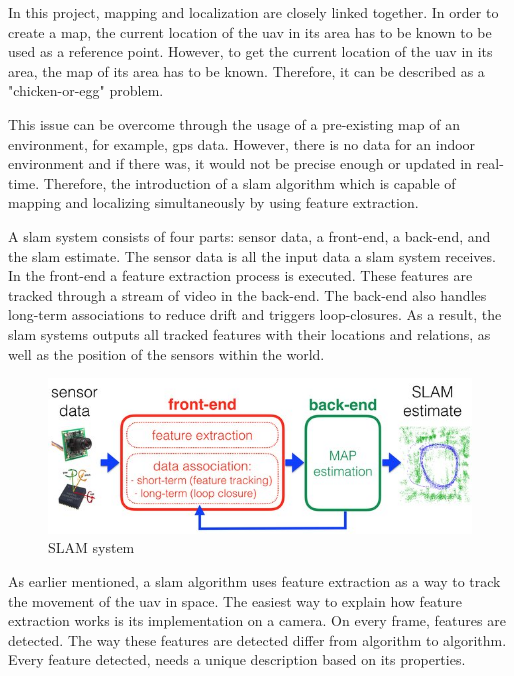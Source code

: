 In this project, mapping and localization are closely linked together. In order to create a map, the current location of the \acs{uav} in its area has to be known to be used as a reference point. However, to get the current location of the \acs{uav} in its area, the map of its area has to be known. Therefore, it can be described as a "chicken\hyp{}or\hyp{}egg" problem.

This issue can be overcome through the usage of a pre-existing map of an environment, for example, \acs{gps} data. However, there is no data for an indoor environment and if there was, it would not be precise enough or updated in real\hyp{}time. Therefore, the introduction of a \acs{slam} algorithm which is capable of mapping and localizing simultaneously by using feature extraction.

A \acs{slam} system consists of four parts: sensor data, a front\hyp{}end, a back\hyp{}end, and the \acs{slam} estimate. The sensor data is all the input data a \acs{slam} system receives. In the front\hyp{}end a feature extraction process is executed. These features are tracked through a stream of video in the back\hyp{}end. The back\hyp{}end also handles long\hyp{}term associations to reduce drift and triggers loop\hyp{}closures. As a result, the \acs{slam} systems outputs all tracked features with their locations and relations, as well as the position of the sensors within the world.

\begin{figure}[!h]
  \centering
  \includegraphics[width=0.75\linewidth]{images/slam_system.jpg}
  \caption{SLAM system}
  \label{fig:slam_system}
\end{figure}

As earlier mentioned, a \acs{slam} algorithm uses feature extraction as a way to track the movement of the \acs{uav} in space. The easiest way to explain how feature extraction works is its implementation on a camera. On every frame, features are detected. The way these features are detected differ from algorithm to algorithm. Every feature detected, needs a unique description based on its properties. 

